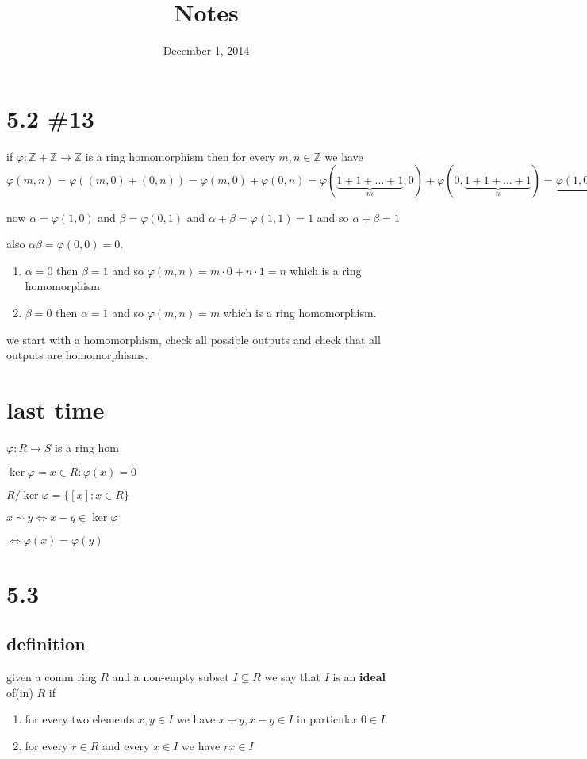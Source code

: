 \documentclass[letterpaper]{article}
\begin{document}
\title{Notes}
\date{December 1, 2014}
\maketitle
\section*{5.2 \#13}
if $\varphi:\mathbb{Z}+\mathbb{Z}\to\mathbb{Z}$ is a ring homomorphism then for every $m,n\in\mathbb{Z}$ we have $\varphi(m,n)=\varphi((m,0)+(0,n))=\varphi(m,0)+\varphi(0,n)=\varphi(\underbrace{1+1+\dots+1}_m,0)+\varphi(0,\underbrace{1+1+\dots+1}_n)=\underbrace{\varphi(1,0)+\dots\varphi(1,0)}_m+\underbrace{\varphi(0,1)+\dots\varphi(0,1)}_n=m\varphi(1,0)+n\varphi(0,1)$

now $\alpha=\varphi(1,0)$ and $\beta=\varphi(0,1)$ and $\alpha+\beta=\varphi(1,1)=1$ and so $\alpha+\beta=1$

also $\alpha\beta=\varphi(0,0)=0$.

\begin{enumerate}
\item
$\alpha=0$ then $\beta=1$ and so $\varphi(m,n)=m\cdot0+n\cdot 1=n$ which is a ring homomorphism
\item
$\beta=0$ then $\alpha=1$ and so $\varphi(m,n)=m$ which is a ring homomorphism.
\end{enumerate}

we start with a homomorphism, check all possible outputs and check that all outputs are homomorphisms.
\section*{last time}
$\varphi:R\to S$ is a ring hom

$\ker\varphi=x\in R:\varphi(x)=0$

$R/\ker\varphi=\{[x]:x\in R\}$

$x\sim y\Leftrightarrow x-y\in \ker\varphi$

$\Leftrightarrow\varphi(x)=\varphi(y)$

\section*{5.3}
\subsection*{definition}
given a comm ring $R$ and a non-empty subset $I\subseteq R$ we say that $I$ is an {\bfseries ideal} of(in) $R$ if
\begin{enumerate}
\item
for every two elements $x,y\in I$ we have $x+y,x-y\in I$ in particular $0\in I$.
\item
for every $r\in R$ and every $x\in I$ we have $rx\in I$

\end{enumerate}
\end{document}
